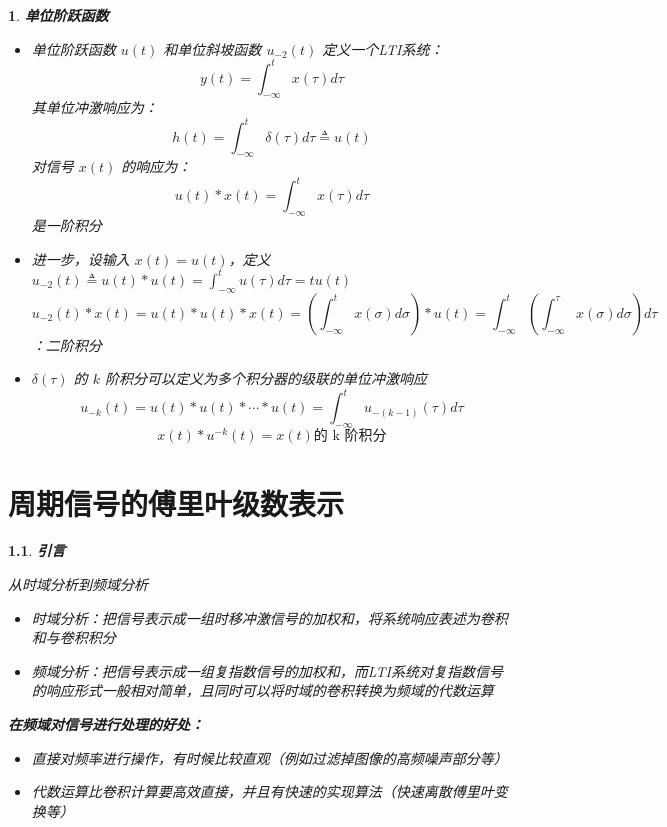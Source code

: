 \documentclass[UTF8]{report}
\theoremstyle{MyLineTheoremStyle} %
\theoremstyle{MyBlockTheoremStyle} %
\theoremstyle{MySubsubsectionStyle} %
\newtheorem{definition}{}
\begin{document}
\begin{definition}
    \textbf{单位阶跃函数}
    \begin{itemize}
        \item 单位阶跃函数 $u(t)$ 和单位斜坡函数 $u_{-2}(t)$
        定义一个LTI系统：
        \[
        y(t) = \int_{-\infty}^{t} x(\tau) d\tau
        \]
        其单位冲激响应为：
        \[
        h(t) = \int_{-\infty}^{t} \delta(\tau) d\tau \triangleq  u(t)
        \]
        对信号 $x(t)$ 的响应为：
        \[
        u(t) * x(t) = \int_{-\infty}^{t} x(\tau) d\tau
        \]
        是一阶积分

        \item 进一步，设输入 $x(t) = u(t)$，定义 $u_{-2}(t) \triangleq u(t) * u(t) = \int_{-\infty}^{t} u(\tau) d\tau = tu(t)$
        \[
        u_{-2}(t) * x(t) = u(t) * u(t) * x(t) = \left(\int_{-\infty}^{t} x(\sigma)d\sigma \right) * u(t) = \int_{-\infty}^{t} \left( \int_{-\infty}^{\tau} x(\sigma) d\sigma \right) d\tau
        \]
        ：二阶积分

        \item $\delta(\tau)$ 的 $k$ 阶积分可以定义为多个积分器的级联的单位冲激响应
        \[
        u_{-k}(t) = u(t) * u(t) * \cdots * u(t) = \int_{-\infty}^{t} u_{-(k-1)}(\tau) d\tau
        \]
        \[
        x(t) * u^{-k}(t) = x(t) \text{的 k 阶积分}
        \]
    \end{itemize}
\end{definition}


\chapter{周期信号的傅里叶级数表示}

\begin{definition}
    \textbf{\fontsize{14}{16}\selectfont 引言}

    从时域分析到频域分析
    \begin{itemize}
        \item 时域分析：把信号表示成一组时移冲激信号的加权和，将系统响应表述为卷积和与卷积积分
        \item 频域分析：把信号表示成一组复指数信号的加权和，而LTI系统对复指数信号的响应形式一般相对简单，且同时可以将时域的卷积转换为频域的代数运算
    \end{itemize}

    \textbf{在频域对信号进行处理的好处：}
    \begin{itemize}
        \item 直接对频率进行操作，有时候比较直观（例如过滤掉图像的高频噪声部分等）
        \item 代数运算比卷积计算要高效直接，并且有快速的实现算法（快速离散傅里叶变换等）
    \end{itemize}
\end{definition}
\end{document}
